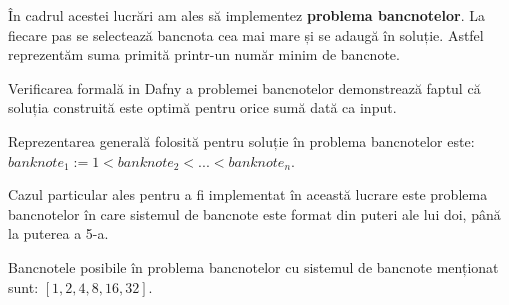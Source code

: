 În cadrul acestei lucrări am ales să implementez \textbf{problema bancnotelor}. La fiecare pas se selectează 
bancnota cea mai mare și se adaugă în soluție. Astfel reprezentăm suma primită printr-un număr minim de bancnote.\par
Verificarea formală in Dafny a problemei bancnotelor demonstrează faptul că soluția construită este optimă
pentru orice sumă dată ca input. \par
Reprezentarea generală folosită pentru soluție în problema bancnotelor este:
$ banknote_{1}:= 1 < banknote_{2} < ... < banknote_{n}$. 

Cazul particular ales pentru a fi implementat în această lucrare este problema bancnotelor în care sistemul de bancnote este format din puteri ale lui doi, 
până la puterea a 5-a.\par
Bancnotele posibile în problema bancnotelor cu sistemul de bancnote menționat sunt: $[1, 2, 4, 8, 16, 32]$. 



